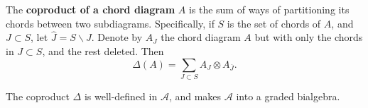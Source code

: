 \begin{definition}
	\label{def:coproduct-in-chord-diagrams}
	The \textbf{coproduct of a chord diagram} \(A\) is the sum of ways of partitioning its chords between two subdiagrams.  
    Specifically, if \(S\) is the set of chords of \(A\), and \(J \subset S\), let \(\widehat{J} = S \smallsetminus J\). Denote by \(A_{J}\) the chord diagram \(A\) but with only the chords in \(J \subset S\), and the rest deleted. Then
	\[\Delta(A) = \sum_{J \subset S} A_{J} \otimes A_{\overline{J}}.\]
\end{definition}

\begin{proposition}
	The coproduct \(\Delta\) is well-defined in \(\mathcal{A}\), and makes \(\mathcal{A}\) into a graded bialgebra.
\end{proposition}


